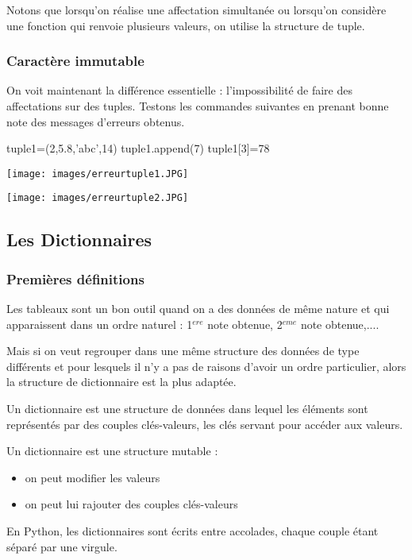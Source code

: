 \documentclass[11pt,a4paper,french,twoside]{PMCours}
\begin{document}
Notons que lorsqu'on réalise une affectation simultanée ou lorsqu'on considère 
une fonction qui renvoie plusieurs valeurs, on utilise la structure de tuple.

\subsubsection*{Caractère immutable}
On voit maintenant la différence essentielle : l'impossibilité de faire des 
affectations sur des tuples. Testons les commandes suivantes en prenant bonne 
note des messages d'erreurs obtenus. 
\begin{Python}
tuple1=(2,5.8,'abc',14)
tuple1.append(7)
tuple1[3]=78
\end{Python}

\medskip
\texttt{[image: images/erreurtuple1.JPG]}

\vspace{1cm}
\texttt{[image: images/erreurtuple2.JPG]}

\subsection{Les Dictionnaires}
\subsubsection*{Premières définitions} 
Les tableaux sont un bon outil quand on a des données de même nature et qui apparaissent 
dans un ordre naturel : 1$^{ere}$ note obtenue, 2$^{eme}$ note obtenue,.... 

Mais si on veut regrouper dans une même structure des données de type différents 
et pour lesquels il n'y a pas de raisons d'avoir un ordre particulier, alors la 
structure de dictionnaire est la plus adaptée. 
\begin{Definition}{} Un dictionnaire est une structure de données dans lequel 
les éléments sont représentés par des couples clés-valeurs, les clés servant pour 
accéder aux valeurs.

Un dictionnaire est une structure mutable :
	\begin{itemize}
	\item on peut modifier les valeurs
	\item on peut lui rajouter des couples clés-valeurs
	\end{itemize}
\end{Definition}

En Python, les dictionnaires sont écrits entre accolades, chaque couple 
 étant séparé par une virgule. 
\end{document}
